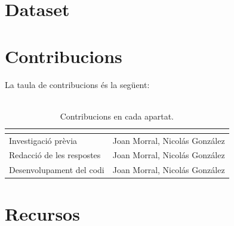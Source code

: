 \documentclass[]{scrartcl}
\begin{document}
\section{Dataset}


\section{Contribucions}
La taula de contribucions és la següent:
\\\\
\begin{table}[htbp]
	\centering
	\begin{tabular}{|l|l|}
		\hline
		\rowcolor[HTML]{000078} 
		\multicolumn{1}{|c|}{\cellcolor[HTML]{000078}{\color[HTML]{FFFFFF} \textbf{Contribucions}}} &
		\multicolumn{1}{c|}{\cellcolor[HTML]{000078}{\color[HTML]{FFFFFF} \textbf{Signatura}}} \\ \hline
		Investigació prèvia       & Joan Morral, Nicolás González \\ \hline
		Redacció de les respostes & Joan Morral, Nicolás González \\ \hline
		Desenvolupament del codi  & Joan Morral, Nicolás González \\ \hline
	\end{tabular}
	\caption{Contribucions en cada apartat.}
	\label{tab:Taula de contribucions}
\end{table}

\section{Recursos}
\end{document}
